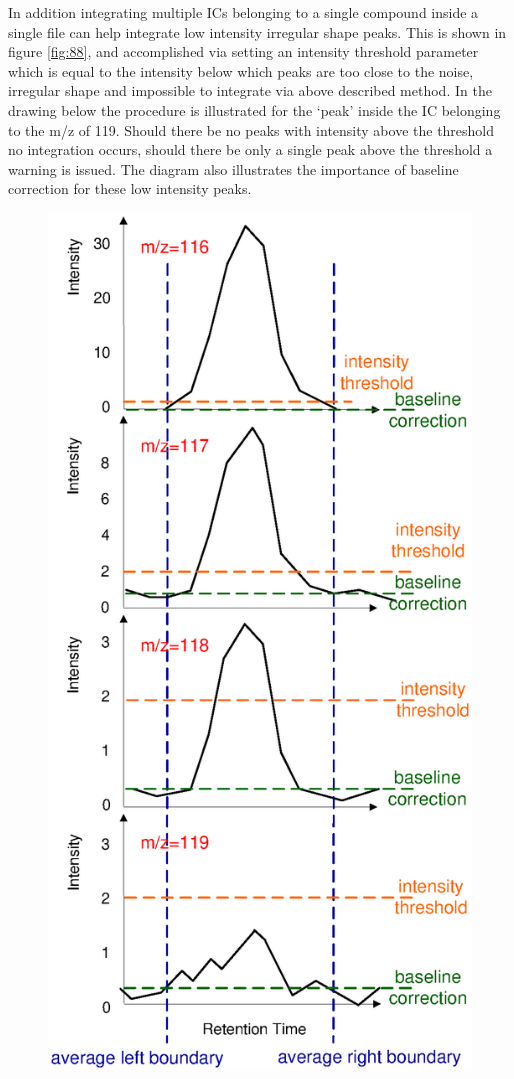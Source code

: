 In addition integrating multiple ICs belonging to a single compound inside a 
single file can help integrate low intensity irregular shape peaks. This is 
shown in figure \ref{fig:88}, and accomplished via setting an intensity 
threshold parameter which is equal to the intensity below which peaks are
too close to the noise, irregular shape and impossible to integrate via above
described method. In the drawing below the procedure is illustrated for the 
‘peak’ inside the IC belonging to the m/z of 119. Should there be no peaks
with intensity above the threshold no integration occurs, should there be
only a single peak above the threshold a warning is issued. The diagram also 
illustrates the importance of baseline correction for these low intensity
peaks.

\begin{figure}
  \begin{center}
    \includegraphics[scale=0.7]{graphics/chapter08/88.eps}

\end{center}
\end{figure}
